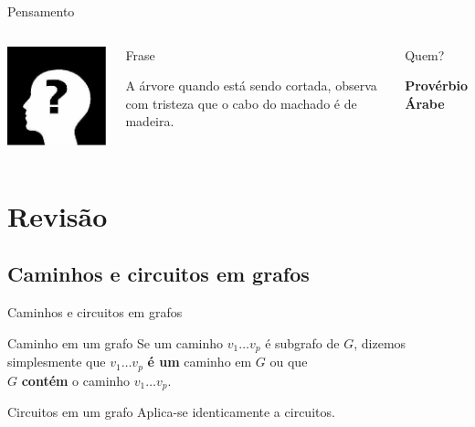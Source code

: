 \documentclass[xcolor=dvipsnames,table]{beamer}
\begin{document}
	\begin{frame}{Pensamento}
		\begin{columns}
		  		\begin{center}
		    		\includegraphics[height=.5\textheight]{images/desconhecido.jpg}
		  		\end{center}
				\begin{block}{Frase}
					\begin{center}
						{\large A árvore quando está sendo cortada, observa com tristeza que o cabo do machado é de madeira.}
					\end{center}
				\end{block}		  		
		  		\begin{block}{Quem?}
		  			\begin{center}
						{\bf Provérbio Árabe}
					\end{center}
				\end{block}
		\end{columns}
	\end{frame}
    
    \section{Revisão}
	
	\subsection{Caminhos e circuitos em grafos}
	\begin{frame}{Caminhos e circuitos em grafos}
		\begin{block}{Caminho em um grafo}
			Se um caminho $v_1 \ldots v_p$ é subgrafo de $G$, dizemos simplesmente que $v_1 \ldots v_p$ {\bf é um} caminho em $G$ ou que \\$G$ {\bf contém} o caminho $v_1 \ldots v_p$.
		\end{block}
		\begin{exampleblock}{Circuitos em um grafo}
			Aplica-se identicamente a circuitos.
		\end{exampleblock} 
	\end{frame}
	
\end{document}
